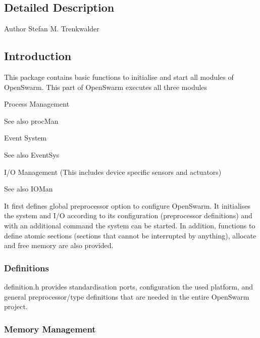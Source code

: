 \subsection{Detailed Description}
\begin{DoxyAuthor}{Author}
Stefan M. Trenkwalder
\end{DoxyAuthor}
\hypertarget{group__base_sec_intro_base}{}\subsection{Introduction}\label{group__base_sec_intro_base}
This package contains basic functions to initialise and start all modules of Open\+Swarm. This part of Open\+Swarm executes all three modules
\begin{DoxyItemize}
\item Process Management \begin{DoxySeeAlso}{See also}
proc\+Man
\end{DoxySeeAlso}

\item Event System \begin{DoxySeeAlso}{See also}
Event\+Sys
\end{DoxySeeAlso}

\item I/\+O Management (This includes device specific sensors and actuators) \begin{DoxySeeAlso}{See also}
I\+O\+Man
\end{DoxySeeAlso}
It first defines global preprocessor option to configure Open\+Swarm. It initialises the system and I/\+O according to its configuration (preprocessor definitions) and with an additional command the system can be started. In addition, functions to define atomic sections (sections that cannot be interrupted by anything), allocate and free memory are also provided.
\end{DoxyItemize}\hypertarget{group__base_ssec_intro_base_defs}{}\subsubsection{Definitions}\label{group__base_ssec_intro_base_defs}
definition.\+h provides standardisation ports, configuration the used platform, and general preprocessor/type definitions that are needed in the entire Open\+Swarm project.\hypertarget{group__base_ssec_intro_base_mem}{}\subsubsection{Memory Management}\label{group__base_ssec_intro_base_mem}
